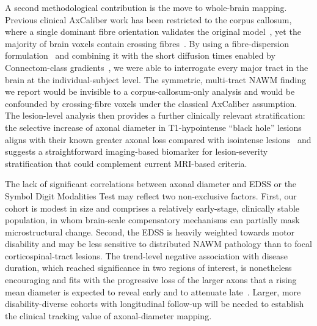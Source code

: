 \documentclass[11pt]{article}
\begin{document}
A second methodological contribution is the move to whole-brain mapping. Previous clinical AxCaliber work has been restricted to the corpus callosum, where a single dominant fibre orientation validates the original model~\cite{assaf2008axcaliber,desantis2019whole}, yet the majority of brain voxels contain crossing fibres~\cite{jeurissen2013investigating}. By using a fibre-dispersion formulation~\cite{tax2014recursive,desantis2019whole} and combining it with the short diffusion times enabled by Connectom-class gradients~\cite{jones2018microstructural}, we were able to interrogate every major tract in the brain at the individual-subject level. The symmetric, multi-tract NAWM finding we report would be invisible to a corpus-callosum-only analysis and would be confounded by crossing-fibre voxels under the classical AxCaliber assumption. The lesion-level analysis then provides a further clinically relevant stratification: the selective increase of axonal diameter in T1-hypointense ``black hole'' lesions aligns with their known greater axonal loss compared with isointense lesions~\cite{vanwaesberghe1999axonal,raz2015relationship} and suggests a straightforward imaging-based biomarker for lesion-severity stratification that could complement current MRI-based criteria.

The lack of significant correlations between axonal diameter and EDSS or the Symbol Digit Modalities Test may reflect two non-exclusive factors. First, our cohort is modest in size and comprises a relatively early-stage, clinically stable population, in whom brain-scale compensatory mechanisms can partially mask microstructural change. Second, the EDSS is heavily weighted towards motor disability and may be less sensitive to distributed NAWM pathology than to focal corticospinal-tract lesions. The trend-level negative association with disease duration, which reached significance in two regions of interest, is nonetheless encouraging and fits with the progressive loss of the larger axons that a rising mean diameter is expected to reveal early and to attenuate late~\cite{tallantyre2010demyelinated,bergers2002axonal}. Larger, more disability-diverse cohorts with longitudinal follow-up will be needed to establish the clinical tracking value of axonal-diameter mapping.
\end{document}
